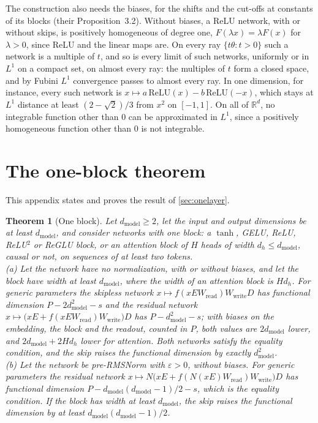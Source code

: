\documentclass[10pt]{article}
\newtheorem{theorem}{Theorem}
\theoremstyle{definition}
\theoremstyle{remark}
\newcommand{\R}{\mathbb{R}}
\newcommand{\Wread}{W_{\mathrm{read}}}
\newcommand{\Wwrite}{W_{\mathrm{write}}}
\newcommand{\dm}{d_{\mathrm{model}}}
\begin{document}
The construction also needs the biases, for the shifts and the cut-offs at constants of its blocks (their Proposition~3.2). Without biases, a ReLU network, with or without skips, is positively homogeneous of degree one, $F(\lambda x) = \lambda F(x)$ for $\lambda > 0$, since ReLU and the linear maps are. On every ray $\{t\theta : t > 0\}$ such a network is a multiple of $t$, and so is every limit of such networks, uniformly or in $L^1$ on a compact set, on almost every ray: the multiples of $t$ form a closed space, and by Fubini $L^1$ convergence passes to almost every ray. In one dimension, for instance, every such network is $x \mapsto a\,\mathrm{ReLU}(x) - b\,\mathrm{ReLU}(-x)$, which stays at $L^1$ distance at least $(2 - \sqrt2)/3$ from $x^2$ on $[-1, 1]$. On all of $\R^d$, no integrable function other than $0$ can be approximated in $L^1$, since a positively homogeneous function other than $0$ is not integrable.

\section{The one-block theorem}\label{app:onelayer}

This appendix states and proves the result of \cref{sec:onelayer}.

\begin{theorem}[One block]\label{thm:onelayer}
Let $\dm \ge 2$, let the input and output dimensions be at least $\dm$, and consider networks with one block: a $\tanh$, GELU, ReLU, ReLU$^2$ or ReGLU block, or an attention block of $H$ heads of width $d_h \le \dm$, causal or not, on sequences of at least two tokens.\\
\textup{(a)} Let the network have no normalization, with or without biases, and let the block have width at least $\dm$, where the width of an attention block is $Hd_h$. For generic parameters the skipless network $x \mapsto f(xE\Wread)\Wwrite D$ has functional dimension $P - 2\dm^2 - s$ and the residual network $x \mapsto \big(xE + f(xE\Wread)\Wwrite\big)D$ has $P - \dm^2 - s$; with biases on the embedding, the block and the readout, counted in $P$, both values are $2\dm$ lower, and $2\dm + 2Hd_h$ lower for attention. Both networks satisfy the equality condition, and the skip raises the functional dimension by exactly $\dm^2$.\\
\textup{(b)} Let the network be pre-RMSNorm with $\varepsilon > 0$, without biases. For generic parameters the residual network $x \mapsto N\big(xE + f(N(xE)\Wread)\Wwrite\big)D$ has functional dimension $P - \dm(\dm-1)/2 - s$, which is the equality condition. If the block has width at least $\dm$, the skip raises the functional dimension by at least $\dm(\dm-1)/2$.
\end{theorem}
\end{document}
